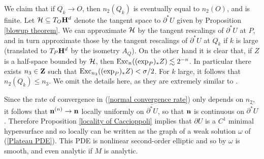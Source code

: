 We claim that if $Q_k \to O$, then $n_2(Q_k)$ is eventually equal to $n_2(O)$, and is finite.
Let $\mathcal H \subseteq T_O\mathbf H^d$ denote the tangent space to $\partial^* U$ given by Proposition \ref{blowup theorem}.
We can approximate $\mathcal H$ by the tangent rescalings of $\partial^* U$ at $P$, and in turn approximate those by the tangent rescalings of $\partial^* U$ at $Q_k$ if $k$ is large (translated to $T_P \mathbf H^d$ by the isometry $A_Q$).
On the other hand it is clear that, if $Z$ is a half-space bounded by $\mathcal H$, then $\operatorname{Exc}_n((\exp_P)_* Z) \lesssim 2^{-n}$.
In particular there exists $n_3 \in \mathbf{Z}$ such that $\operatorname{Exc}_{n_3}((\exp_P)_* Z) < \sigma/2$.
For $k$ large, it follows that $n_2(Q_k) \leq n_3$.
We omit the details here, as they are extremely similar to \cite[Teorema 4]{Miranda67}.

Since the rate of convergence in (\ref{normal convergence rate}) only depends on $n_2$, it follows that $\mathbf n^{(n)} \to \mathbf n$ locally uniformly on $\overline{\partial^* U}$, so that $\mathbf n$ is continuous on $\overline{\partial^* U}$.
Therefore Proposition \ref{locality of Caccioppoli} implies that $\partial U$ is a $C^1$ minimal hypersurface and so locally can be written as the graph of a weak solution $\omega$ of (\ref{Plateau PDE}).
This PDE is nonlinear second-order elliptic and so by \cite{morrey2009multiple} $\omega$ is smooth, and even analytic if $M$ is analytic.
